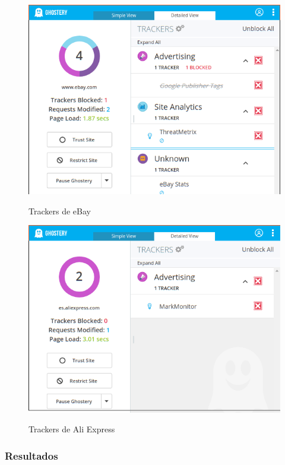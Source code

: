 \documentclass[10pt,a4paper]{article}
\begin{document}
\begin{figure}[H]
  \centering
  \includegraphics[scale=0.6]{ghost_ebay.png}\\
  \caption{Trackers de eBay}
  \label{fig:object}
\end{figure}

\begin{figure}[H]
  \centering
  \includegraphics[scale=0.6]{ghost_aliexpress.png}\\
  \caption{Trackers de Ali Express}
  \label{fig:object}
\end{figure}

\subsubsection*{Resultados}
\end{document}
